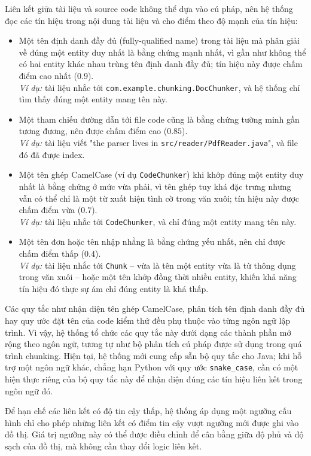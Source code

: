 Liên kết giữa tài liệu và source code không thể dựa vào cú pháp, nên hệ thống đọc các tín hiệu trong nội dung tài liệu và cho điểm theo độ mạnh của tín hiệu:

\begin{itemize}
  \item Một tên định danh đầy đủ (fully-qualified name) trong tài liệu mà phân giải về đúng một entity duy nhất là bằng chứng mạnh nhất, vì gần như không thể có hai entity khác nhau trùng tên định danh đầy đủ; tín hiệu này được chấm điểm cao nhất ($0.9$). \\
  \textit{Ví dụ:} tài liệu nhắc tới \texttt{com.example.chunking.DocChunker}, và hệ thống chỉ tìm thấy đúng một entity mang tên này.
  \item Một tham chiếu đường dẫn tới file code cũng là bằng chứng tường minh gần tương đương, nên được chấm điểm cao ($0.85$). \\
  \textit{Ví dụ:} tài liệu viết "the parser lives in \texttt{src/reader/PdfReader.java}", và file đó đã được index.
  \item Một tên ghép CamelCase (ví dụ \texttt{CodeChunker}) khi khớp đúng một entity duy nhất là bằng chứng ở mức vừa phải, vì tên ghép tuy khá đặc trưng nhưng vẫn có thể chỉ là một từ xuất hiện tình cờ trong văn xuôi; tín hiệu này được chấm điểm vừa ($0.7$). \\
  \textit{Ví dụ:} tài liệu nhắc tới \texttt{CodeChunker}, và chỉ đúng một entity mang tên này.
  \item Một tên đơn hoặc tên nhập nhằng là bằng chứng yếu nhất, nên chỉ được chấm điểm thấp ($0.4$). \\
  \textit{Ví dụ:} tài liệu nhắc tới \texttt{Chunk} -- vừa là tên một entity vừa là từ thông dụng trong văn xuôi -- hoặc một tên khớp đồng thời nhiều entity, khiến khả năng tín hiệu đó thực sự ám chỉ đúng entity là khá thấp.
\end{itemize}

Các quy tắc như nhận diện tên ghép CamelCase, phân tích tên định danh đầy đủ hay quy ước đặt tên của code kiểm thử đều phụ thuộc vào từng ngôn ngữ lập trình. Vì vậy, hệ thống tổ chức các quy tắc này dưới dạng các thành phần mở rộng theo ngôn ngữ, tương tự như bộ phân tích cú pháp được sử dụng trong quá trình chunking. Hiện tại, hệ thống mới cung cấp sẵn bộ quy tắc cho Java; khi hỗ trợ một ngôn ngữ khác, chẳng hạn Python với quy ước \texttt{snake\_case}, cần có một hiện thực riêng của bộ quy tắc này để nhận diện đúng các tín hiệu liên kết trong ngôn ngữ đó.

Để hạn chế các liên kết có độ tin cậy thấp, hệ thống áp dụng một ngưỡng cấu hình chỉ cho phép những liên kết có điểm tin cậy vượt ngưỡng mới được ghi vào đồ thị. Giá trị ngưỡng này có thể được điều chỉnh để cân bằng giữa độ phủ và độ sạch của đồ thị, mà không cần thay đổi logic liên kết.

